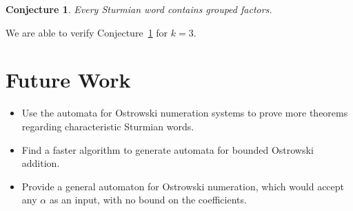 \documentclass[a4paper]{article}
\theoremstyle{definition}
\theoremstyle{remark}
\theoremstyle{remark}
\theoremstyle{plain}
\newtheorem{conjecture}[definition]{Conjecture}
\begin{document}
\begin{conjecture}\label{conj:grouped}
    Every Sturmian word contains grouped factors.
\end{conjecture}

We are able to verify Conjecture~\ref{conj:grouped} for $k=3$.


\section{Future Work}
\begin{itemize}
\item Use the automata for Ostrowski numeration systems to prove more theorems regarding characteristic Sturmian words.
\item Find a faster algorithm to generate automata for bounded Ostrowski addition.
\item Provide a general automaton for Ostrowski numeration, which would accept any $\alpha$ as an input, with no bound on the coefficients.
\end{itemize}

\printbibliography
\end{document}
